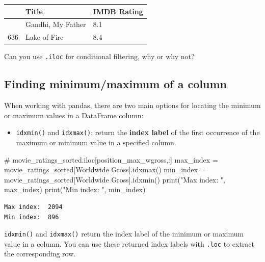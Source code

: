 \documentclass[
  letterpaper,
  DIV=11,
  numbers=noendperiod]{scrreprt}
\newenvironment{Shaded}{\begin{snugshade}}{\end{snugshade}}
\newcommand{\BuiltInTok}[1]{\textcolor[rgb]{0.00,0.23,0.31}{#1}}
\newcommand{\CommentTok}[1]{\textcolor[rgb]{0.37,0.37,0.37}{#1}}
\newcommand{\NormalTok}[1]{\textcolor[rgb]{0.00,0.23,0.31}{#1}}
\newcommand{\OperatorTok}[1]{\textcolor[rgb]{0.37,0.37,0.37}{#1}}
\newcommand{\StringTok}[1]{\textcolor[rgb]{0.13,0.47,0.30}{#1}}
\providecommand{\tightlist}{%
  \setlength{\itemsep}{0pt}\setlength{\parskip}{0pt}}\usepackage{longtable,booktabs,array}
\begin{document}
\begin{longtable}[]{@{}lll@{}}
\toprule\noalign{}
& Title & IMDB Rating \\
\midrule\noalign{}
\endhead
\bottomrule\noalign{}
\endlastfoot
21 & Gandhi, My Father & 8.1 \\
636 & Lake of Fire & 8.4 \\
\end{longtable}

Can you use \texttt{.iloc} for conditional filtering, why or why not?

\hypertarget{finding-minimummaximum-of-a-column}{%
\subsection{Finding minimum/maximum of a
column}\label{finding-minimummaximum-of-a-column}}

When working with pandas, there are two main options for locating the
minimum or maximum values in a DataFrame column:

\begin{itemize}
\tightlist
\item
  \texttt{idxmin()} and \texttt{idxmax()}: return the \textbf{index
  label} of the first occurrence of the maximum or minimum value in a
  specified column.
\end{itemize}

\begin{Shaded}
\begin{Highlighting}[]
\CommentTok{\# movie\_ratings\_sorted.iloc[position\_max\_wgross,:]}
\NormalTok{max\_index }\OperatorTok{=}\NormalTok{ movie\_ratings\_sorted[}\StringTok{\textquotesingle{}Worldwide Gross\textquotesingle{}}\NormalTok{].idxmax()}
\NormalTok{min\_index }\OperatorTok{=}\NormalTok{ movie\_ratings\_sorted[}\StringTok{\textquotesingle{}Worldwide Gross\textquotesingle{}}\NormalTok{].idxmin()}
\BuiltInTok{print}\NormalTok{(}\StringTok{"Max index: "}\NormalTok{, max\_index)}
\BuiltInTok{print}\NormalTok{(}\StringTok{"Min index: "}\NormalTok{, min\_index)}
\end{Highlighting}
\end{Shaded}

\begin{verbatim}
Max index:  2094
Min index:  896
\end{verbatim}

\texttt{idxmin()} and \texttt{idxmax()} return the index label of the
minimum or maximum value in a column. You can use these returned index
labels with \texttt{.loc} to extract the corresponding row.
\end{document}
